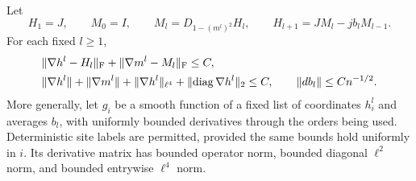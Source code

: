 \begin{lemma}\label{lem:primary-derivatives}
Let
\begin{equation}
 H_1=J,\qquad M_0=I,\qquad
 M_l=D_{1-(m^l)^2}H_l,\qquad
 H_{l+1}=JM_l-jb_lM_{l-1}.
 \label{eq:primary-formal}
\end{equation}
For each fixed $l\geq1$,
\begin{align}
 &\lVert \nabla h^l-H_l\rVert_{\mathrm F}
   +\lVert \nabla m^l-M_l\rVert_{\mathrm F}\leq C,\label{eq:primary-error}\\
 &\lVert \nabla h^l\rVert+\lVert \nabla m^l\rVert
   +\lVert \nabla h^l\rVert_{\ell^4}
   +\lVert \operatorname{diag}\nabla h^l\rVert_2\leq C,
   \qquad \lVert db_l\rVert\leq Cn^{-1/2}.
 \label{eq:primary-bounds}
\end{align}
More generally, let $g_i$ be a smooth function of a fixed list of coordinates
$h_i^l$ and averages $b_l$, with uniformly bounded derivatives through the
orders being used.  Deterministic site labels are permitted, provided the
same bounds hold uniformly in $i$.  Its derivative matrix has bounded
operator norm, bounded diagonal $\ell^2$ norm, and bounded entrywise
$\ell^4$ norm.
\end{lemma}

